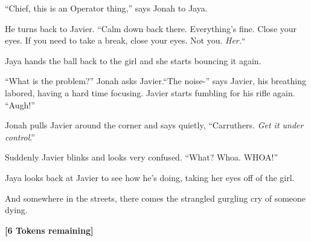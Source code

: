 ``Chief, this is an Operator thing,'' says Jonah to Jaya.

He turns back to Javier.  ``Calm down back there.  Everything's fine.  Close your eyes.  If you need to take a break, close your eyes.  Not you.  \textit{Her.}``  

Jaya hands the ball back to the girl and she starts bouncing it again.

``What is the problem?'' Jonah asks Javier.``The noise-'' says Javier, his breathing labored, having a hard time focusing.  Javier starts fumbling for his rifle again. ``Augh!''

Jonah pulls Javier around the corner and says quietly, ``Carruthers.  \textit{Get it under control}.''

Suddenly Javier blinks and looks very confused.  ``What?  Whoa.  WHOA!''

Jaya looks back at Javier to see how he's doing, taking her eyes off of the girl.



And somewhere in the streets, there comes the strangled gurgling cry of someone dying.





\textbf{{[}6 Tokens remaining{]}}









